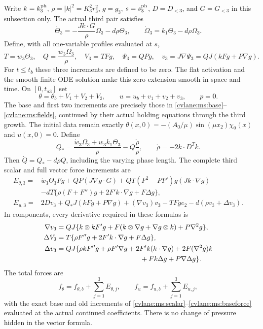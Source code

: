 Write $k=k_3^{\rm ph}$, $\rho=|k|^2=K_3^2r_3^2$, $g=g_3$,
$s=s_3^{\rm ph}$, $D=D_{<3}$, and $G=G_{<3}$ in this
subsection only. The actual third pair satisfies
\begin{equation}\label{cvlane:tgs:pair}
 \dot\Theta_3=-\frac{Jk\cdot G}{\rho}\Omega_3-d\rho\Theta_3,
 \qquad\dot\Omega_3=k_1\Theta_3-d\rho\Omega_3.
\end{equation}
Define, with all one-variable profiles evaluated at $s$,
\begin{equation}\label{cvlane:tgs:fields}
 T=w_3\Theta_3,\quad Q=\frac{w_3\Omega_3}{\rho},\quad
 V_3=TFg,\quad\Psi_3=QPg,\quad
 v_3=J\nabla\Psi_3=QJ(kFg+P\nabla g).
\end{equation}
For $t\leq t_b$ these three increments are defined to be zero.
The flat activation and the smooth finite ODE solution make this
zero extension smooth in space and time. On $[0,t_{a3}]$ set
\[
 \theta=\theta_b+V_1+V_2+V_3,\qquad
 u=u_b+v_1+v_2+v_3,\qquad p=0.
\]
The base and first two increments are precisely those in
\eqref{cvlane:ms:base}--\eqref{cvlane:ms:fields}, continued by their actual
holding equations through the third growth. The initial data
remain exactly
$\theta(x,0)=-(A_0/\mu)\sin(\mu x_2)\chi_0(x)$ and $u(x,0)=0$.
Define
\begin{equation}\label{cvlane:tgs:Qrest}
 Q_* =\frac{\dot w_3\Omega_3+w_3k_1\Theta_3}{\rho}
                         -Q\frac{\dot\rho}{\rho},\qquad
 \dot\rho=-2k\cdot D^Tk.
\end{equation}
Then $\dot Q=Q_*-d\rho Q$, including the varying phase length.
The complete third scalar and full vector force increments are
\begin{align}
 E_{\theta,3}={}&\dot w_3\Theta_3Fg+QP(J\nabla g\cdot G)
       +QT(F^2-PF')g(Jk\cdot\nabla g)\nonumber\\
 &-dT\{\rho(F+F'')g+2F'k\cdot\nabla g+F\Delta g\},
 \label{cvlane:tgs:scalar}\\
 E_{u,3}={}&2Dv_3+Q_*J(kFg+P\nabla g)
        +(\nabla v_3)v_3-TFg e_2-d(\rho v_3+\Delta v_3).
 \label{cvlane:tgs:vector}
\end{align}
In components, every derivative required in these formulas is
\begin{align}
 \nabla v_3={}&QJ\{k\otimes k F'g
       +F(k\otimes\nabla g+\nabla g\otimes k)+P\nabla^2g\},
 \label{cvlane:tgs:velocityjet}\\
 \Delta V_3={}&T\{\rho F''g+2F'k\cdot\nabla g+F\Delta g\},
 \label{cvlane:tgs:scalarLaplacian}\\
 \Delta v_3={}&QJ\{\rho kF''g+\rho F'\nabla g
       +2F'k(k\cdot\nabla g)+2F(\nabla^2g)k\nonumber\\
 &\hspace{38mm}+Fk\Delta g+P\nabla\Delta g\}.
 \label{cvlane:tgs:vectorLaplacian}
\end{align}
The total forces are
\begin{equation}\label{cvlane:tgs:totalforce}
 f_\theta=f_{\theta,b}+\sum_{j=1}^3E_{\theta,j},\qquad
 f_u=f_{u,b}+\sum_{j=1}^3E_{u,j},
\end{equation}
with the exact base and old increments of
\eqref{cvlane:ms:scalar}--\eqref{cvlane:ms:baseforce} evaluated at the actual
continued coefficients. There is no change of pressure hidden in
the vector formula.


